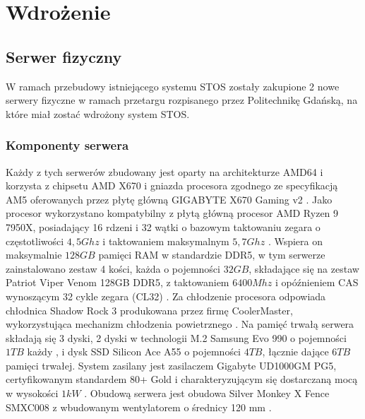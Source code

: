 \chapter{Wdrożenie}


\section{Serwer fizyczny}
W ramach przebudowy istniejącego systemu STOS zostały zakupione 2 nowe serwery fizyczne w ramach przetargu rozpisanego przez Politechnikę Gdańską, na które miał zostać wdrożony system STOS.

\subsection{Komponenty serwera}
Każdy z tych serwerów zbudowany jest oparty na architekturze AMD64 i korzysta z chipsetu AMD X670 i gniazda procesora zgodnego ze specyfikacją AM5 oferowanych przez płytę główną GIGABYTE X670 Gaming v2 \cite{gigabyteX670}. Jako procesor wykorzystano kompatybilny z płytą główną procesor AMD Ryzen 9 7950X, posiadający 16 rdzeni i 32 wątki o bazowym taktowaniu zegara o częstotliwości $4,5 Ghz$ i taktowaniem maksymalnym $5,7 Ghz$ \cite{ryzen}. Wspiera on maksymalnie $128 GB$ pamięci RAM w standardzie DDR5, w tym serwerze zainstalowano zestaw 4 kości, każda o pojemności $32 GB$, składające się na zestaw Patriot Viper Venom 128GB DDR5, z taktowaniem $6400 Mhz$ i opóźnieniem CAS wynoszącym 32 cykle zegara (CL32) \cite{patriotRam}. Za chłodzenie procesora odpowiada chłodnica Shadow Rock 3 produkowana przez firmę CoolerMaster, wykorzystująca mechanizm chłodzenia powietrznego \cite{coolermaster}. Na pamięć trwałą serwera składają się 3 dyski, 2 dyski w technologii M.2 Samsung Evo 990 o pojemności $1 TB$ każdy \cite{samsungSsd}, i dysk SSD Silicon Ace A55 \cite{sataSsd} o pojemności $4 TB$, łącznie dające $6 TB$ pamięci trwałej. System zasilany jest zasilaczem Gigabyte UD1000GM PG5, certyfikowanym standardem 80+ Gold i charakteryzującym się dostarczaną mocą w wysokości $1 kW$ \cite{zasilka}.  Obudową serwera jest obudowa Silver Monkey X Fence SMXC008 z wbudowanym wentylatorem o średnicy 120 mm \cite{obudowa}.


